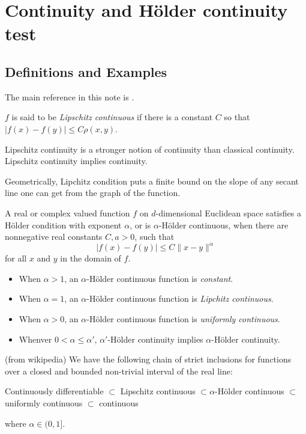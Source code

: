 \section{Continuity and Hölder continuity test}
\subsection{Definitions and Examples}

The main reference in this note is \cite{durrettProbabilityTheory}.

\begin{definition}
	$f$ is said to be \textit{Lipschitz continuous} if there is a constant $C$ so that $|f(x)-f(y)| \leq C \rho(x, y)$.
\end{definition}

Lipschitz continuity is a stronger notion of continuity than classical continuity. Lipschitz continuity implies continuity.

Geometrically, Lipchitz condition puts a finite bound on the slope of any secant line one can get from the graph of the function.

\begin{definition}
	A real or complex valued function $f$ on $d$-dimensional Euclidean space satisfies a Hölder condition with exponent $\alpha$, or is $\alpha$-Hölder continuous, when there are nonnegative real constants $C, a>0$, such that
\[
|f(x)-f(y)| \leq C\|x-y\|^\alpha
\]
for all $x$ and $y$ in the domain of $f$.
\end{definition}

\begin{itemize}
	\item When $\alpha > 1$, an $\alpha$-Hölder continuous function is \textit{constant}.
	\item When $\alpha = 1$, an $\alpha$-Hölder continuous function is \textit{Lipchitz continuous}.
	\item When $\alpha >0$, an $\alpha$-Hölder continuous function is \textit{uniformly continuous}.
	\item Whenver $0 < \alpha \le  \alpha'$, $\alpha'$-Hölder continuity implies $\alpha$-Hölder continuity.
\end{itemize}

\begin{remark}
	(from wikipedia) We have the following chain of strict inclusions for functions over a closed and bounded non-trivial interval of the real line:

Continuously differentiable $\subset $ Lipschitz continuous $\subset \alpha$-Hölder continuous $\subset$ uniformly continuous $\subset$ continuous

where $\alpha \in (0,1]$.
\end{remark}

